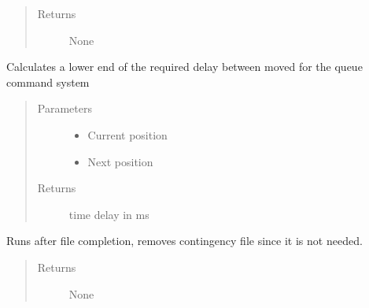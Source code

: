\documentclass[letterpaper,10pt,english]{sphinxmanual}
\begin{document}
\begin{fulllineitems}
\begin{fulllineitems}
\begin{quote}
\begin{description}
\item[{Returns}] \leavevmode
\sphinxAtStartPar
None

\end{description}\end{quote}

\end{fulllineitems}


\begin{fulllineitems}
\label{\detokenize{index:droogCNC.TwoAxisStage.calcDelay}}
\sphinxAtStartPar
Calculates a lower end of the required delay between moved for the queue command system
\begin{quote}\begin{description}
\item[{Parameters}] \leavevmode\begin{itemize}
\item {} 
\sphinxAtStartPar
{} \textendash{} Current position

\item {} 
\sphinxAtStartPar
{} \textendash{} Next position

\end{itemize}

\item[{Returns}] \leavevmode
\sphinxAtStartPar
time delay in ms

\end{description}\end{quote}

\end{fulllineitems}


\begin{fulllineitems}
\label{\detokenize{index:droogCNC.TwoAxisStage.finishRun}}
\sphinxAtStartPar
Runs after file completion, removes contingency file since it is not needed.
\begin{quote}\begin{description}
\item[{Returns}] \leavevmode
\sphinxAtStartPar
None


\end{description}
\end{quote}
\end{fulllineitems}
\end{fulllineitems}
\end{document}

